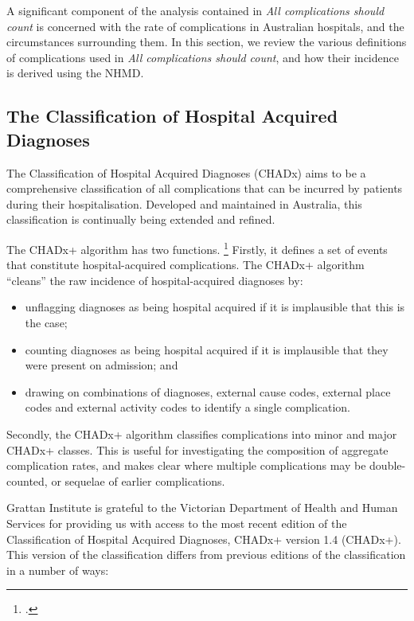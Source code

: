\documentclass[submission]{grattan}
\newcommand*{\myTitle}{All complications should count}
\begin{document}
A significant component of the analysis contained in \textit{\myTitle} is concerned with the rate of complications in Australian hospitals, and the circumstances surrounding them.
In this section, we review the various definitions of complications used in \textit{\myTitle}, and how their incidence is derived using the NHMD.

\subsection{The Classification of Hospital Acquired Diagnoses}\label{subsec:the-classification-of-hospital-acquired-diagnoses}

The Classification of Hospital Acquired Diagnoses (CHADx) aims to be a comprehensive classification of all complications that can be incurred by patients during their hospitalisation.
Developed and maintained in Australia, this classification is continually being extended and refined.

The CHADx+ algorithm has two functions.%
	\footcite{michel2009using}
Firstly, it defines a set of events that constitute hospital-acquired complications.
The CHADx+ algorithm ``cleans'' the raw incidence of hospital-acquired diagnoses by:

\begin{itemize}
\item
  unflagging diagnoses as being hospital acquired if it is implausible that this is the case;
\item
  counting diagnoses as being hospital acquired if it is implausible that they were present on admission; and
\item
  drawing on combinations of diagnoses, external cause codes, external place codes and external activity codes to identify a single complication.
\end{itemize}

Secondly, the CHADx+ algorithm classifies complications into minor and major CHADx+ classes.
This is useful for investigating the composition of aggregate complication rates, and makes clear where multiple complications may be double-counted, or sequelae of earlier complications.

Grattan Institute is grateful to the Victorian Department of Health and Human Services for providing us with access to the most recent edition of the Classification of Hospital Acquired Diagnoses, CHADx+ version 1.4 (CHADx+).
This version of the classification differs from previous editions of the classification in a number of ways:
\end{document}
